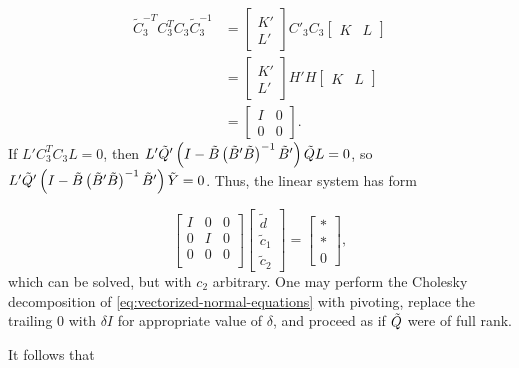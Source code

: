 \begin{align*}
\tilde{C}_3^{-T} C_3^{T} C_3 \tilde{C}_3^{-1} &= \begin{bmatrix} K' \\ L' \end{bmatrix} C'_3C_3 \begin{bmatrix} K &  L\end{bmatrix} \\
&= \begin{bmatrix} K' \\ L' \end{bmatrix} H'H \begin{bmatrix} K &  L\end{bmatrix} \\
&= \begin{bmatrix} I & 0 \\ 0 & 0 \end{bmatrix}.
\end{align*}
\noindent
If $L'C_3^{T} C_3 L = 0$, then $L'\tilde{Q}'\left( I - \tilde{B}\left( \tilde{B}' \tilde{B} \right)^{-1} \tilde{B}' \right)\tilde{Q} L = 0$, so $L'\tilde{Q}'\left( I - \tilde{B}\left( \tilde{B}' \tilde{B} \right)^{-1} \tilde{B}' \right) \tilde{Y} = 0$. Thus, the linear system has form

\begin{equation} \label{eq:vectorized-normal-equations-cholesky-2}
\begin{bmatrix}
I & 0 & 0\\
0 & I & 0 \\
0 & 0 & 0 \\
\end{bmatrix}
\begin{bmatrix}
\tilde{d}\\
\tilde{c}_1\\
\tilde{c}_2
\end{bmatrix}
= \begin{bmatrix}
* \\
* \\
0
\end{bmatrix},
\end{equation}
\noindent
which can be solved, but with $c_2$ arbitrary. One may perform the Cholesky decomposition of \ref{eq:vectorized-normal-equations} with pivoting, replace the trailing $0$ with $\delta I$ for appropriate value of $\delta$, and proceed as if $\tilde{Q}$ were of full rank. 
\bigskip

It follows that

